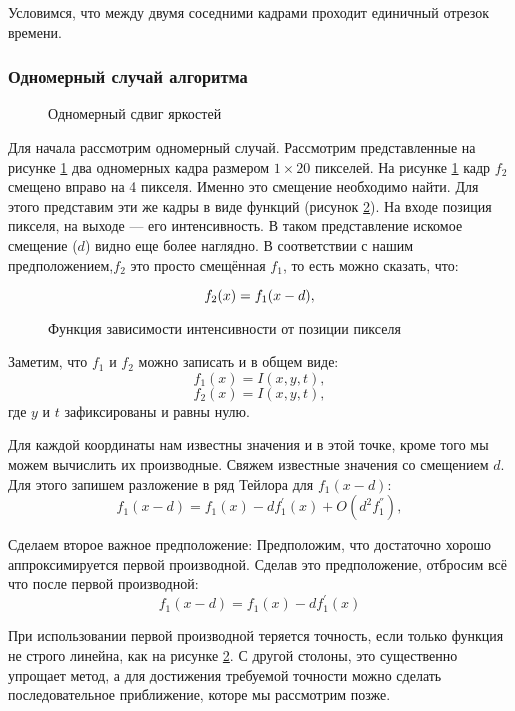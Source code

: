 Условимся, что между двумя соседними кадрами проходит единичный отрезок времени.
\subsubsection{Одномерный случай алгоритма}

\begin{figure}[ht]
\caption{Одномерный сдвиг яркостей}
\label{pic:math_1}
\end{figure}

Для начала рассмотрим одномерный случай. Рассмотрим представленные на рисунке \ref{pic:math_1} два одномерных кадра размером $1 \times 20$ пикселей. На рисунке \ref{pic:math_1} кадр $f_2$ смещено вправо на 4 пикселя. Именно это смещение необходимо найти. Для этого представим эти же кадры в виде функций (рисунок \ref{pic:math_2}). На входе позиция пикселя, на выходе — его интенсивность. В таком представление искомое смещение ($d$) видно еще более наглядно. В соответствии с нашим предположением,$f_2$ это просто смещённая $f_1$, то есть можно сказать, что:

\begin{equation}
\numberwithin{equation}{section}
\label{eq:f_2}
f_2(x)=f_1(x-d),
\end{equation}
\begin{figure}[ht]
\caption{Функция зависимости интенсивности от позиции пикселя}
\label{pic:math_2}
\end{figure}

Заметим, что $f_1$ и $f_2$ можно записать и в общем виде: 
$$f_1(x)=I(x,y,t),$$
$$f_2(x)=I(x,y,t),$$
где $y$ и $t$ зафиксированы и равны нулю.

Для каждой координаты нам известны значения и в этой точке, кроме того мы можем вычислить их производные. Свяжем известные значения со смещением $d$. Для этого запишем разложение в ряд Тейлора для $f_1(x-d)$:
$$f_1(x-d)=f_1(x)-df^{'}_1(x)+O(d^2f^{''}_1),$$

Сделаем второе важное предположение: Предположим, что достаточно хорошо аппроксимируется первой производной. Сделав это предположение, отбросим всё что после первой производной:
$$f_1(x-d)=f_1(x)-df_1^{'}(x)$$

При использовании первой производной теряется точность, если только функция не строго линейна, как на рисунке \ref{pic:math_2}. С другой столоны, это существенно упрощает метод, а для достижения требуемой точности можно сделать последовательное приближение, которе мы рассмотрим позже.


